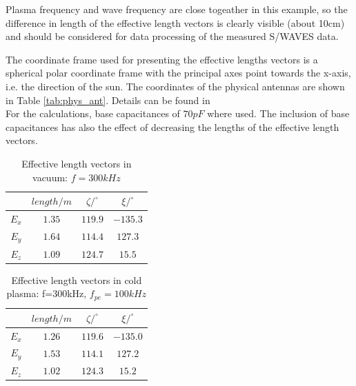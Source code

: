 \documentclass[a4paper,11pt]{article}
\begin{document}
Plasma frequency and wave frequency are close togeather in this example, so the difference in length of the effective length vectors is clearly visible (about 10cm) and should be considered for data processing of the measured S/WAVES data.

The coordinate frame used for presenting the effective lengths vectors is a spherical polar coordinate frame with the principal axes point towards the x-axis, i.e. the direction of the sun. The coordinates of the physical antennas are shown in Table \ref{tab:phys_ant}. Details can be found in \cite{ossi09} \\

For the calculations, base capacitances of $70pF$ where used. The inclusion of base capacitances has also the effect of decreasing the lengths of the effective length vectors.\\


\begin{table}
\begin{center}
\caption{Effective length vectors in vacuum: $f=300kHz$}
\label{tab:heff_vacuum_stereo}
\begin{tabular}{|c|c|c|c|}
 \hline
 & $length/m$ & $\zeta/^\circ$ & $\xi/^\circ$ \\
\hline
$E_x$ & $1.35$ & $119.9$ & $-135.3$ \\
$E_y$ & $1.64$ & $114.4$ & $127.3$ \\
$E_z$ & $1.09$ & $124.7$ & $15.5$ \\
\hline\end{tabular}
\end{center}
\end{table}



\begin{table}
\begin{center}
\caption{Effective length vectors in cold plasma: f=300kHz, $f_{pe}=100kHz$}
\label{tab:heff_cold_plasma_stereo}
\begin{tabular}{|c|c|c|c|}
 \hline
 & $length/m$ & $\zeta/^\circ$ & $\xi/^\circ$ \\
\hline
$E_x$ & $1.26$ & $119.6$ & $-135.0$ \\
$E_y$ & $1.53$ & $114.1$ & $127.2$ \\
$E_z$ & $1.02$ & $124.3$ & $15.2$ \\
\hline\end{tabular}
\end{center}
\end{table}
\end{document}

